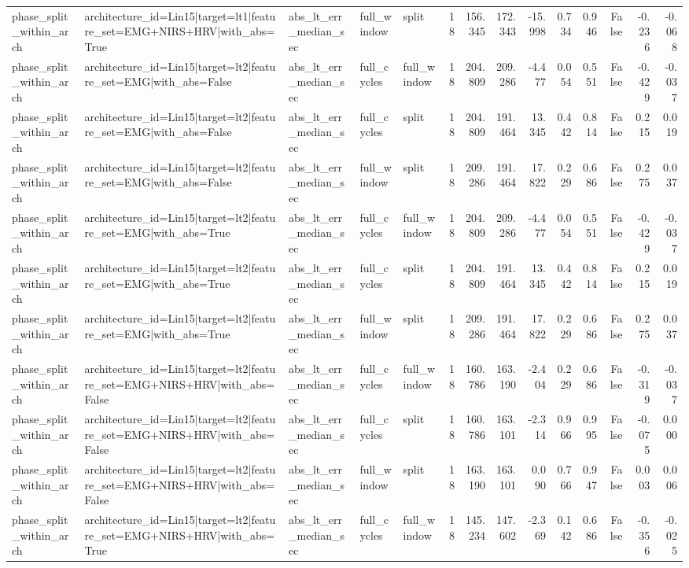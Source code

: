 \begin{table}
\begin{tabular}{lllllrrrrrrrrr}
phase_split_within_arch & architecture_id=Lin15|target=lt1|feature_set=EMG+NIRS+HRV|with_abs=True & abs_lt_err_median_sec & full_window & split & 18 & 156.345 & 172.343 & -15.998 & 0.734 & 0.946 & False & -0.236 & -0.068 \\
phase_split_within_arch & architecture_id=Lin15|target=lt2|feature_set=EMG|with_abs=False & abs_lt_err_median_sec & full_cycles & full_window & 18 & 204.809 & 209.286 & -4.477 & 0.054 & 0.551 & False & -0.429 & -0.037 \\
phase_split_within_arch & architecture_id=Lin15|target=lt2|feature_set=EMG|with_abs=False & abs_lt_err_median_sec & full_cycles & split & 18 & 204.809 & 191.464 & 13.345 & 0.442 & 0.814 & False & 0.215 & 0.019 \\
phase_split_within_arch & architecture_id=Lin15|target=lt2|feature_set=EMG|with_abs=False & abs_lt_err_median_sec & full_window & split & 18 & 209.286 & 191.464 & 17.822 & 0.229 & 0.686 & False & 0.275 & 0.037 \\
phase_split_within_arch & architecture_id=Lin15|target=lt2|feature_set=EMG|with_abs=True & abs_lt_err_median_sec & full_cycles & full_window & 18 & 204.809 & 209.286 & -4.477 & 0.054 & 0.551 & False & -0.429 & -0.037 \\
phase_split_within_arch & architecture_id=Lin15|target=lt2|feature_set=EMG|with_abs=True & abs_lt_err_median_sec & full_cycles & split & 18 & 204.809 & 191.464 & 13.345 & 0.442 & 0.814 & False & 0.215 & 0.019 \\
phase_split_within_arch & architecture_id=Lin15|target=lt2|feature_set=EMG|with_abs=True & abs_lt_err_median_sec & full_window & split & 18 & 209.286 & 191.464 & 17.822 & 0.229 & 0.686 & False & 0.275 & 0.037 \\
phase_split_within_arch & architecture_id=Lin15|target=lt2|feature_set=EMG+NIRS+HRV|with_abs=False & abs_lt_err_median_sec & full_cycles & full_window & 18 & 160.786 & 163.190 & -2.404 & 0.229 & 0.686 & False & -0.319 & -0.037 \\
phase_split_within_arch & architecture_id=Lin15|target=lt2|feature_set=EMG+NIRS+HRV|with_abs=False & abs_lt_err_median_sec & full_cycles & split & 18 & 160.786 & 163.101 & -2.314 & 0.966 & 0.995 & False & -0.075 & 0.000 \\
phase_split_within_arch & architecture_id=Lin15|target=lt2|feature_set=EMG+NIRS+HRV|with_abs=False & abs_lt_err_median_sec & full_window & split & 18 & 163.190 & 163.101 & 0.090 & 0.766 & 0.947 & False & 0.003 & 0.006 \\
phase_split_within_arch & architecture_id=Lin15|target=lt2|feature_set=EMG+NIRS+HRV|with_abs=True & abs_lt_err_median_sec & full_cycles & full_window & 18 & 145.234 & 147.602 & -2.369 & 0.142 & 0.686 & False & -0.356 & -0.025 \\

\end{tabular}
\end{table}
